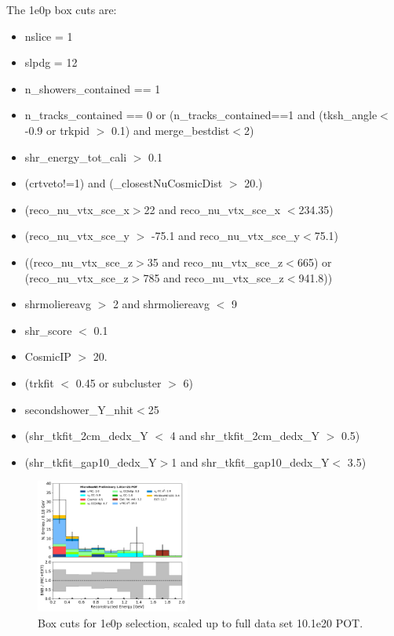 \documentclass[a4paper]{article}
\begin{document}
The 1e0p box cuts are:

\begin{itemize}
    \item nslice = 1
    \item slpdg = 12
    \item n\_showers\_contained == 1
    \item n\_tracks\_contained == 0 or (n\_tracks\_contained==1 and (tksh\_angle$<$-0.9 or trkpid $>$ 0.1) and merge\_bestdist$<$2)
    \item shr\_energy\_tot\_cali $>$ 0.1
    \item (crtveto!=1) and (\_closestNuCosmicDist $>$ 20.)
    \item (reco\_nu\_vtx\_sce\_x$>$22 and reco\_nu\_vtx\_sce\_x $<$234.35)
    \item (reco\_nu\_vtx\_sce\_y $>$ -75.1 and reco\_nu\_vtx\_sce\_y$<$75.1)
    \item ((reco\_nu\_vtx\_sce\_z$>$35 and reco\_nu\_vtx\_sce\_z$<$665) or (reco\_nu\_vtx\_sce\_z$>$785 and reco\_nu\_vtx\_sce\_z$<$941.8))
    \item shrmoliereavg $>$ 2 and shrmoliereavg $<$ 9
    \item shr\_score $<$ 0.1
    \item CosmicIP $>$ 20.
    \item (trkfit $<$ 0.45 or subcluster $>$ 6)
    \item secondshower\_Y\_nhit$<$25
    \item (shr\_tkfit\_2cm\_dedx\_Y $<$ 4 and shr\_tkfit\_2cm\_dedx\_Y $>$ 0.5)
    \item (shr\_tkfit\_gap10\_dedx\_Y$>$1 and shr\_tkfit\_gap10\_dedx\_Y$<$ 3.5)
\end{itemize}

\begin{figure}[H]
\begin{center}
\includegraphics[width=0.45\textwidth]{1e0p/reco_e_01162020_RUN3.pdf}
\caption{\label{fig:1e0p:cutbased:RUN3} Box cuts for 1e0p selection, scaled up to full data set 10.1e20 POT.}
\end{center}
\end{figure}
\end{document}
